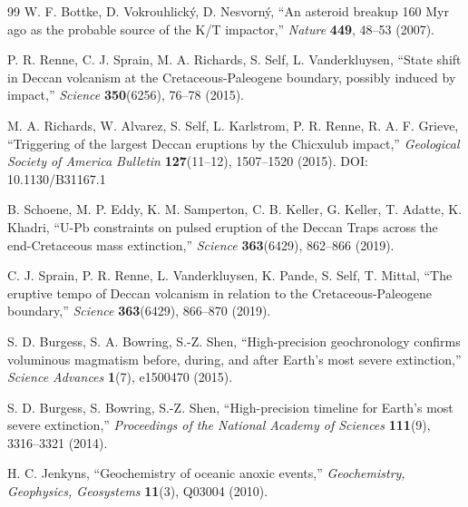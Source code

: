 \documentclass[11pt,a4paper]{article}
\begin{document}
\begin{thebibliography}{99}
		W. F. Bottke, D. Vokrouhlický, D. Nesvorný, ``An asteroid breakup 160 Myr ago as the probable source of the K/T impactor,''
		\emph{Nature} \textbf{449}, 48–53 (2007).
		
		P. R. Renne, C. J. Sprain, M. A. Richards, S. Self, L. Vanderkluysen, ``State shift in Deccan volcanism at the Cretaceous-Paleogene boundary, possibly induced by impact,''
		\emph{Science} \textbf{350}(6256), 76–78 (2015).
		
		M. A. Richards, W. Alvarez, S. Self, L. Karlstrom, P. R. Renne, R. A. F. Grieve, ``Triggering of the largest Deccan eruptions by the Chicxulub impact,''
		\emph{Geological Society of America Bulletin} \textbf{127}(11–12), 1507–1520 (2015). DOI: 10.1130/B31167.1
		
		B. Schoene, M. P. Eddy, K. M. Samperton, C. B. Keller, G. Keller, T. Adatte, K. Khadri, ``U-Pb constraints on pulsed eruption of the Deccan Traps across the end-Cretaceous mass extinction,''
		\emph{Science} \textbf{363}(6429), 862–866 (2019).
		
		C. J. Sprain, P. R. Renne, L. Vanderkluysen, K. Pande, S. Self, T. Mittal, ``The eruptive tempo of Deccan volcanism in relation to the Cretaceous-Paleogene boundary,''
		\emph{Science} \textbf{363}(6429), 866–870 (2019).
		
		S. D. Burgess, S. A. Bowring, S.-Z. Shen, ``High-precision geochronology confirms voluminous magmatism before, during, and after Earth's most severe extinction,''
		\emph{Science Advances} \textbf{1}(7), e1500470 (2015).
		
		S. D. Burgess, S. Bowring, S.-Z. Shen, ``High-precision timeline for Earth's most severe extinction,''
		\emph{Proceedings of the National Academy of Sciences} \textbf{111}(9), 3316–3321 (2014).
		
		H. C. Jenkyns, ``Geochemistry of oceanic anoxic events,''
		\emph{Geochemistry, Geophysics, Geosystems} \textbf{11}(3), Q03004 (2010).
		

\end{thebibliography}
\end{document}
